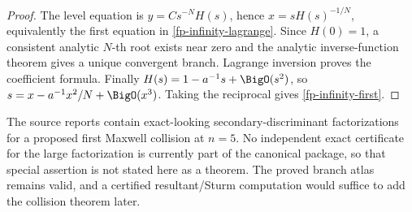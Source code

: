 \begin{proof}
The level equation is \(y=Cs^{-N}H(s)\), hence
\(x=sH(s)^{-1/N}\), equivalently the first equation in
\cref{fp-infinity-lagrange}.  Since \(H(0)=1\), a consistent analytic
\(N\)-th root exists near zero and the analytic inverse-function theorem gives
a unique convergent branch.  Lagrange inversion proves the coefficient
formula.  Finally \(H(s)=1-a^{-1}s+\BigO(s^2)\), so
\(s=x-a^{-1}x^2/N+\BigO(x^3)\).  Taking the reciprocal gives
\cref{fp-infinity-first}.
\end{proof}

\begin{warning}
The source reports contain exact-looking secondary-discriminant factorizations
for a proposed first Maxwell collision at \(n=5\).  No independent exact
certificate for the large factorization is currently part of the canonical
package, so that special assertion is not stated here as a theorem.  The
proved branch atlas remains valid, and a certified resultant/Sturm computation
would suffice to add the collision theorem later.
\end{warning}
